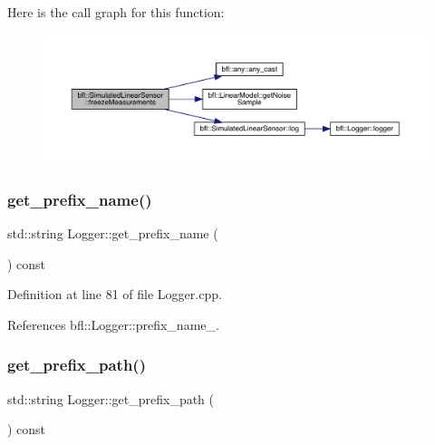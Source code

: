 Here is the call graph for this function\+:
\nopagebreak
\begin{figure}[H]
\begin{center}
\leavevmode
\includegraphics[width=350pt]{classbfl_1_1SimulatedLinearSensor_a683f147d792a79c5ad4c6746210dfdee_cgraph}
\end{center}
\end{figure}
\mbox{\label{classbfl_1_1Logger_a913a795b7bfbf378815eeb342d68a7c0}} 
\subsubsection{\texorpdfstring{get\+\_\+prefix\+\_\+name()}{get\_prefix\_name()}}
{\footnotesize\ttfamily std\+::string Logger\+::get\+\_\+prefix\+\_\+name (\begin{DoxyParamCaption}{ }\end{DoxyParamCaption}) const\hspace{0.3cm}{\ttfamily [inherited]}}



Definition at line 81 of file Logger.\+cpp.



References bfl\+::\+Logger\+::prefix\+\_\+name\+\_\+.

\mbox{\label{classbfl_1_1Logger_a56cf1a4e712bf23d9978420a8a59a62b}} 
\subsubsection{\texorpdfstring{get\+\_\+prefix\+\_\+path()}{get\_prefix\_path()}}
{\footnotesize\ttfamily std\+::string Logger\+::get\+\_\+prefix\+\_\+path (\begin{DoxyParamCaption}{ }\end{DoxyParamCaption}) const\hspace{0.3cm}{\ttfamily [inherited]}}



